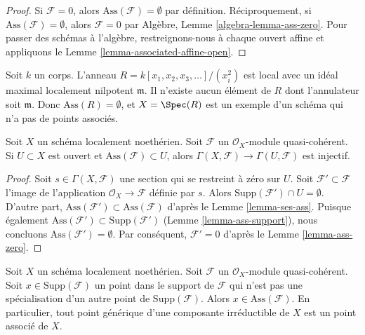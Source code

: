 \begin{proof}
Si  $\mathcal{F} = 0$, alors  $\text{Ass}(\mathcal{F}) = \emptyset$  par définition. Réciproquement, si
 $\text{Ass}(\mathcal{F}) = \emptyset$, alors  $\mathcal{F} = 0$  par Algèbre, Lemme  \ref{algebra-lemma-ass-zero}. Pour passer des
schémas à l'algèbre, restreignons-nous à chaque ouvert affine et appliquons le Lemme
 \ref{lemma-associated-affine-open}.
\end{proof}

\begin{example}
\label{example-no-associated-prime}
Soit  $k$  un corps. L'anneau  $R = k[x_1, x_2, x_3, \ldots]/(x_i^2)$  est local avec un idéal maximal
localement nilpotent  $\mathfrak m$. Il n'existe aucun élément de  $R$  dont
l'annulateur soit  $\mathfrak m$. Donc  $\text{Ass}(R) = \emptyset$, et  $X = \Spec(R)$  est un exemple
d'un schéma qui n'a pas de points associés.
\end{example}

\begin{lemma}
\label{lemma-restriction-injective-open-contains-ass}
Soit  $X$  un schéma localement noethérien. Soit  $\mathcal{F}$  un
 $\mathcal{O}_X$-module quasi-cohérent. Si  $U \subset X$  est ouvert et  $\text{Ass}(\mathcal{F}) \subset U$,
alors  $\Gamma(X, \mathcal{F}) \to \Gamma(U, \mathcal{F})$  est injectif.
\end{lemma}

\begin{proof}
Soit  $s \in \Gamma(X, \mathcal{F})$  une section qui se restreint à zéro sur  $U$. Soit
 $\mathcal{F}' \subset \mathcal{F}$  l'image de l'application  $\mathcal{O}_X \to \mathcal{F}$  définie par  $s$. Alors
 $\text{Supp}(\mathcal{F}') \cap U = \emptyset$. D'autre part,  $\text{Ass}(\mathcal{F}') \subset \text{Ass}(\mathcal{F})$  d'après le Lemme  \ref{lemma-ses-ass}. Puisque
également  $\text{Ass}(\mathcal{F}') \subset \text{Supp}(\mathcal{F}')$  (Lemme  \ref{lemma-ass-support}), nous concluons  $\text{Ass}(\mathcal{F}') = \emptyset$. Par
conséquent,  $\mathcal{F}' = 0$  d'après le Lemme  \ref{lemma-ass-zero}.
\end{proof}

\begin{lemma}
\label{lemma-minimal-support-in-ass}
Soit  $X$  un schéma localement noethérien. Soit  $\mathcal{F}$  un
 $\mathcal{O}_X$-module quasi-cohérent. Soit  $x \in \text{Supp}(\mathcal{F})$  un point dans le support de
 $\mathcal{F}$  qui n’est pas une spécialisation d’un autre point de  $\text{Supp}(\mathcal{F})$.
Alors  $x \in \text{Ass}(\mathcal{F})$. En particulier, tout point générique d’une composante
irréductible de  $X$  est un point associé de  $X$.
\end{lemma}

